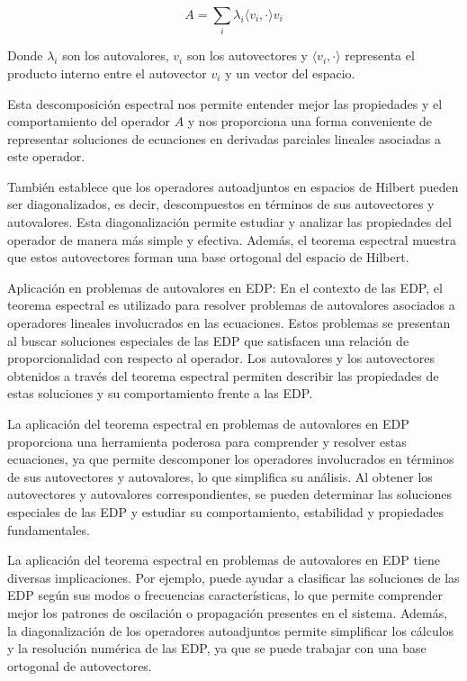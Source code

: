 \documentclass{article}
\begin{document}
    \begin{equation}
    A = \sum_{i} \lambda_i \langle v_i, \cdot \rangle v_i
    \end{equation}
    
    Donde $\lambda_i$ son los autovalores, $v_i$ son los autovectores y $\langle v_i, \cdot \rangle$ representa el producto interno entre el autovector $v_i$ y un vector del espacio.
    
    Esta descomposición espectral nos permite entender mejor las propiedades y el comportamiento del operador $A$ y nos proporciona una forma conveniente de representar soluciones de ecuaciones en derivadas parciales lineales asociadas a este operador.
    
    También establece que los operadores autoadjuntos en espacios de Hilbert pueden ser diagonalizados, es decir, descompuestos en términos de sus autovectores y autovalores. Esta diagonalización permite estudiar y analizar las propiedades del operador de manera más simple y efectiva. Además, el teorema espectral muestra que estos autovectores forman una base ortogonal del espacio de Hilbert.

    Aplicación en problemas de autovalores en EDP: En el contexto de las EDP, el teorema espectral es utilizado para resolver problemas de autovalores asociados a operadores lineales involucrados en las ecuaciones. Estos problemas se presentan al buscar soluciones especiales de las EDP que satisfacen una relación de proporcionalidad con respecto al operador. Los autovalores y los autovectores obtenidos a través del teorema espectral permiten describir las propiedades de estas soluciones y su comportamiento frente a las EDP.

    La aplicación del teorema espectral en problemas de autovalores en EDP proporciona una herramienta poderosa para comprender y resolver estas ecuaciones, ya que permite descomponer los operadores involucrados en términos de sus autovectores y autovalores, lo que simplifica su análisis. Al obtener los autovectores y autovalores correspondientes, se pueden determinar las soluciones especiales de las EDP y estudiar su comportamiento, estabilidad y propiedades fundamentales.

    La aplicación del teorema espectral en problemas de autovalores en EDP tiene diversas implicaciones. Por ejemplo, puede ayudar a clasificar las soluciones de las EDP según sus modos o frecuencias características, lo que permite comprender mejor los patrones de oscilación o propagación presentes en el sistema. Además, la diagonalización de los operadores autoadjuntos permite simplificar los cálculos y la resolución numérica de las EDP, ya que se puede trabajar con una base ortogonal de autovectores.
\end{document}
